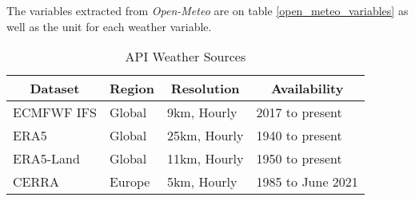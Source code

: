 The variables extracted from \textit{Open-Meteo} are on table \ref{open_meteo_variables} as well as the unit for each weather variable.


\begin{table}[H]
	\caption{API Weather Sources \cite{Zippenfenig_Open-Meteo, Hersbach_ERA5, Munoz_ERA5_LAND, Schimanke_CERRA}}
	\centering
	\label{Datasets_api}
	\begin{tabular}{llll}
		\hline
		\multicolumn{1}{c}{Dataset} & \multicolumn{1}{c}{Region} & \multicolumn{1}{c}{Resolution} & \multicolumn{1}{c}{Availability} \\ \hline
		ECMFWF IFS & Global & 9km, Hourly  & 2017 to present   \\
		ERA5       & Global & 25km, Hourly & 1940 to present   \\
		ERA5-Land  & Global & 11km, Hourly & 1950 to present   \\
		CERRA      & Europe & 5km, Hourly  & 1985 to June 2021
	\end{tabular}
\end{table}




